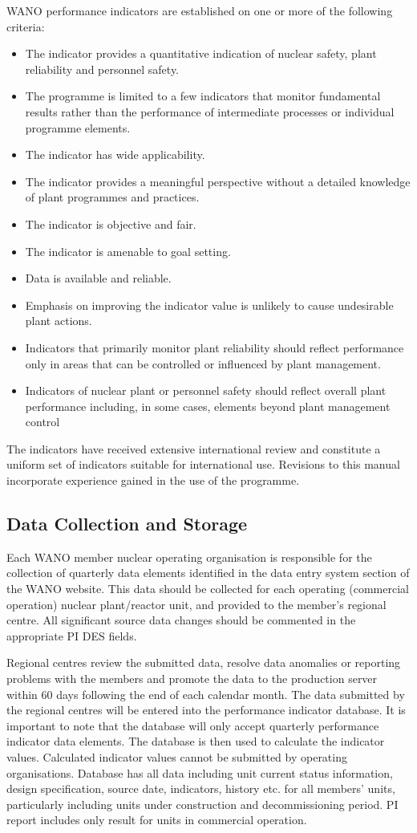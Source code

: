 WANO performance indicators are established on one or more of the
following criteria:
\begin{itemize}
\item The indicator provides a quantitative indication of nuclear safety, plant reliability and personnel safety.
\item The programme is limited to a few indicators that monitor fundamental results rather than the performance of intermediate processes or individual programme elements.
\item The indicator has wide applicability.
\item The indicator provides a meaningful perspective without a detailed knowledge of plant programmes and practices.
\item The indicator is objective and fair.
\item The indicator is amenable to goal setting.
\item Data is available and reliable.
\item Emphasis on improving the indicator value is unlikely to cause undesirable plant actions.
\item Indicators that primarily monitor plant reliability should reflect performance only in areas that can be controlled or influenced by plant management.
\item Indicators of nuclear plant or personnel safety should reflect
  overall plant performance including, in some cases, elements beyond
  plant management control
\end{itemize}
The indicators have received extensive international review and constitute a uniform set of indicators suitable for international use. Revisions to this manual incorporate experience gained in the use of the programme.
\subsection*{Data Collection and Storage}
Each WANO member nuclear operating organisation is responsible for the
collection of quarterly data elements identified in the data entry
system section of the WANO website. This data should be collected for
each operating (commercial operation) nuclear plant/reactor unit, and
provided to the member's regional centre. All significant source data
changes should be commented in the appropriate PI DES fields.

Regional centres review the submitted data, resolve data anomalies or reporting problems with the members and promote the data to the production server within 60 days following the end of each calendar month. The data submitted by the regional centres will be entered into the performance indicator database. It is important to note that the database will only accept quarterly performance indicator data elements. The database is then used to calculate the indicator values. Calculated indicator values cannot be submitted by operating organisations.
Database has all data including unit current status information, design specification, source date, indicators, history etc. for all members’ units, particularly including units under construction and decommissioning period.
PI report includes only result for units in commercial operation.

